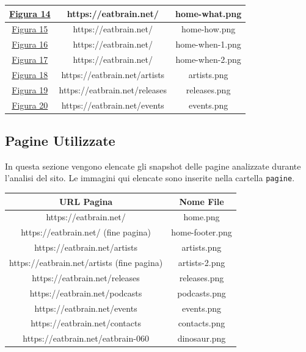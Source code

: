 \documentclass[10pt,a4paper]{article}
\begin{document}
\begin{center}
\begin{tabular}{| c | c | c |}
	\hyperref[img-home-what]{Figura 14} & https://eatbrain.net/ & home-what.png \\\hline
	\hyperref[img-home-how]{Figura 15} & https://eatbrain.net/ & home-how.png \\\hline
	\hyperref[home-when-1]{Figura 16} & https://eatbrain.net/ & home-when-1.png \\\hline
	\hyperref[home-when-2]{Figura 17} & https://eatbrain.net/ & home-when-2.png \\\hline
	\hyperref[img-artists]{Figura 18} & https://eatbrain.net/artists & artists.png \\\hline
	\hyperref[img-releases]{Figura 19} & https://eatbrain.net/releases & releases.png \\\hline
	\hyperref[img-events]{Figura 20} & https://eatbrain.net/events & events.png \\\hline
\end{tabular}
\end{center}
\newpage
\subsection{Pagine Utilizzate}
In questa sezione vengono elencate gli snapshot delle pagine analizzate durante l'analisi del sito. Le immagini qui elencate sono inserite nella cartella \texttt{pagine}.\\
\begin{center}
\setlength{\tabcolsep}{15pt}
\begin{tabular}{| c | c |}
	\hline
	\textbf{URL Pagina}  & \textbf{Nome File} \\\hline
	https://eatbrain.net/ & home.png \\\hline
	https://eatbrain.net/ (fine pagina) & home-footer.png \\\hline
	https://eatbrain.net/artists & artists.png \\\hline
	https://eatbrain.net/artists (fine pagina) & artists-2.png \\\hline
	https://eatbrain.net/releases & releases.png \\\hline
	https://eatbrain.net/podcasts & podcasts.png \\\hline
	https://eatbrain.net/events & events.png \\\hline
	https://eatbrain.net/contacts & contacts.png \\\hline
	https://eatbrain.net/eatbrain-060 & dinosaur.png \\\hline
\end{tabular}
\end{center}
\end{document}

